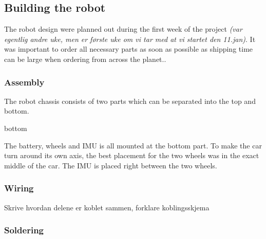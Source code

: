 \subsection{Building the robot}
The robot design were planned out during the first week of the project \textit{(var egentlig andre uke, men er første uke om vi tar med at vi startet den 11.jan)}. It was important to order all necessary parts as soon as possible as shipping time can be large when ordering from across the planet..
\subsubsection{Assembly}
The robot chassis consists of two parts which can be separated into the top and bottom.

bottom

The battery, wheels and IMU is all mounted at the bottom part. To make the car turn around its own axis, the best placement for the two wheels was in the exact middle of the car. The IMU is placed right between the two wheels. 

\subsubsection{Wiring}
Skrive hvordan delene er koblet sammen, forklare koblingsskjema

\subsubsection{Soldering}
